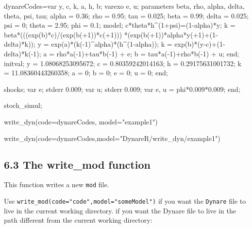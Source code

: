 \documentclass[
  letterpaper,
  DIV=11,
  numbers=noendperiod]{scrartcl}
\newenvironment{Shaded}{\begin{snugshade}}{\end{snugshade}}
\newcommand{\AttributeTok}[1]{\textcolor[rgb]{0.40,0.45,0.13}{#1}}
\newcommand{\FunctionTok}[1]{\textcolor[rgb]{0.28,0.35,0.67}{#1}}
\newcommand{\NormalTok}[1]{\textcolor[rgb]{0.00,0.23,0.31}{#1}}
\newcommand{\OtherTok}[1]{\textcolor[rgb]{0.00,0.23,0.31}{#1}}
\newcommand{\StringTok}[1]{\textcolor[rgb]{0.13,0.47,0.30}{#1}}
\begin{document}
\begin{Shaded}
\begin{Highlighting}[]
\NormalTok{dynareCodes}\OtherTok{=}\StringTok{\textquotesingle{}var y, c, k, a, h, b;}
\StringTok{varexo e, u;}
\StringTok{parameters beta, rho, alpha, delta, theta, psi, tau;}
\StringTok{alpha = 0.36;}
\StringTok{rho   = 0.95;}
\StringTok{tau   = 0.025;}
\StringTok{beta  = 0.99;}
\StringTok{delta = 0.025;}
\StringTok{psi   = 0;}
\StringTok{theta = 2.95;}
\StringTok{phi   = 0.1;}
\StringTok{model;}
\StringTok{c*theta*h\^{}(1+psi)=(1{-}alpha)*y;}
\StringTok{k = beta*(((exp(b)*c)/(exp(b(+1))*c(+1)))}
\StringTok{         *(exp(b(+1))*alpha*y(+1)+(1{-}delta)*k));}
\StringTok{y = exp(a)*(k({-}1)\^{}alpha)*(h\^{}(1{-}alpha));}
\StringTok{k = exp(b)*(y{-}c)+(1{-}delta)*k({-}1);}
\StringTok{a = rho*a({-}1)+tau*b({-}1) + e;}
\StringTok{b = tau*a({-}1)+rho*b({-}1) + u;}
\StringTok{end;}
\StringTok{initval;}
\StringTok{y = 1.08068253095672;}
\StringTok{c = 0.80359242014163;}
\StringTok{h = 0.29175631001732;}
\StringTok{k = 11.08360443260358;}
\StringTok{a = 0;}
\StringTok{b = 0;}
\StringTok{e = 0;}
\StringTok{u = 0;}
\StringTok{end;}

\StringTok{shocks;}
\StringTok{var e; stderr 0.009;}
\StringTok{var u; stderr 0.009;}
\StringTok{var e, u = phi*0.009*0.009;}
\StringTok{end;}

\StringTok{stoch\_simul;\textquotesingle{}}


\FunctionTok{write\_dyn}\NormalTok{(}\AttributeTok{code=}\NormalTok{dynareCodes, }\AttributeTok{model=}\StringTok{"example1"}\NormalTok{)}

\FunctionTok{write\_dyn}\NormalTok{(}\AttributeTok{code=}\NormalTok{dynareCodes,}\AttributeTok{model=}\StringTok{"DynareR/write\_dyn/example1"}\NormalTok{)}
\end{Highlighting}
\end{Shaded}

\hypertarget{the-write_mod-function}{%
\subsection{6.3 The write\_mod function}\label{the-write_mod-function}}

This function writes a new \texttt{mod} file.

Use \texttt{write\_mod(code="code",model="someModel")} if you want the
\texttt{Dynare} file to live in the current working directory. if you
want the Dynare file to live in the path different from the current
working directory:
\end{document}
